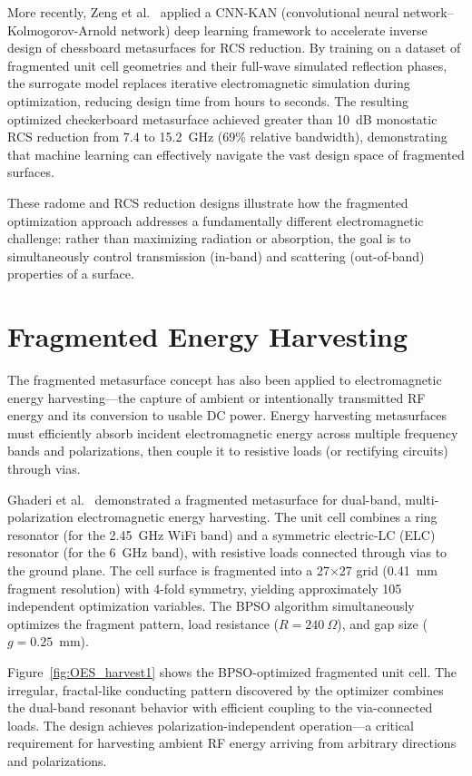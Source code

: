 More recently, Zeng et al.\ \cite{Zeng2026ChessboardRCS} applied a CNN-KAN (convolutional neural network--Kolmogorov-Arnold network) deep learning framework to accelerate inverse design of chessboard metasurfaces for RCS reduction.  By training on a dataset of fragmented unit cell geometries and their full-wave simulated reflection phases, the surrogate model replaces iterative electromagnetic simulation during optimization, reducing design time from hours to seconds.  The resulting optimized checkerboard metasurface achieved greater than 10~dB monostatic RCS reduction from 7.4 to 15.2~GHz (69\% relative bandwidth), demonstrating that machine learning can effectively navigate the vast design space of fragmented surfaces.

These radome and RCS reduction designs illustrate how the fragmented optimization approach addresses a fundamentally different electromagnetic challenge: rather than maximizing radiation or absorption, the goal is to simultaneously control transmission (in-band) and scattering (out-of-band) properties of a surface.


\section{Fragmented Energy Harvesting}
\label{sec:harvesting}

The fragmented metasurface concept has also been applied to electromagnetic energy harvesting---the capture of ambient or intentionally transmitted RF energy and its conversion to usable DC power.  Energy harvesting metasurfaces must efficiently absorb incident electromagnetic energy across multiple frequency bands and polarizations, then couple it to resistive loads (or rectifying circuits) through vias.

Ghaderi et al.\ \cite{Ghaderi2018EnergyHarvesting} demonstrated a fragmented metasurface for dual-band, multi-polarization electromagnetic energy harvesting.  The unit cell combines a ring resonator (for the 2.45~GHz WiFi band) and a symmetric electric-LC (ELC) resonator (for the 6~GHz band), with resistive loads connected through vias to the ground plane.  The cell surface is fragmented into a 27$\times$27 grid (0.41~mm fragment resolution) with 4-fold symmetry, yielding approximately 105 independent optimization variables.  The BPSO algorithm simultaneously optimizes the fragment pattern, load resistance ($R = 240~\Omega$), and gap size ($g = 0.25$~mm).

Figure~\ref{fig:OES_harvest1} shows the BPSO-optimized fragmented unit cell.  The irregular, fractal-like conducting pattern discovered by the optimizer combines the dual-band resonant behavior with efficient coupling to the via-connected loads.  The design achieves polarization-independent operation---a critical requirement for harvesting ambient RF energy arriving from arbitrary directions and polarizations.

